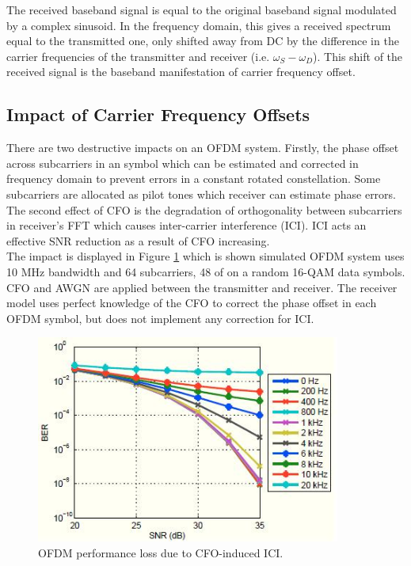 The received baseband signal is equal to the original baseband signal modulated by a complex sinusoid. In the frequency domain, this gives a received spectrum equal to the transmitted one, only shifted away from DC by the difference in the carrier frequencies of the transmitter and receiver (i.e. $\omega_{S}- \omega_{D}$). This shift of the received
signal is the baseband manifestation of carrier frequency offset.

\subsection{Impact of Carrier Frequency Offsets}
\label{Impact_of_CFO}
There are two destructive impacts on an OFDM system. Firstly, the phase offset across subcarriers in an symbol which can be  estimated and corrected in frequency domain to prevent errors in a constant rotated constellation. Some subcarriers are allocated as pilot tones which receiver can estimate phase errors.\\
The second effect of CFO is the degradation of orthogonality between subcarriers in receiver's FFT which causes inter-carrier interference (ICI). ICI acts an effective SNR reduction as a result of CFO increasing.\\
The impact is displayed in Figure \ref{fig:cfo_impact_on_ici} which is shown simulated OFDM system uses 10 MHz bandwidth and 64 subcarriers, 48 of on a random 16-QAM data symbols. CFO and AWGN are applied between the transmitter and receiver. The receiver model uses perfect knowledge of the CFO to correct the phase offset in each OFDM symbol, but does not implement any correction for ICI. \cite{murphy_thesis}\\

\begin{figure}[h!]
\centering
\includegraphics[width=10cm]{content/fig/cfo_on_ici.JPG}
\caption{OFDM performance loss due to CFO-induced ICI.\cite{murphy_thesis}}
\label{fig:cfo_impact_on_ici}
\end{figure}

